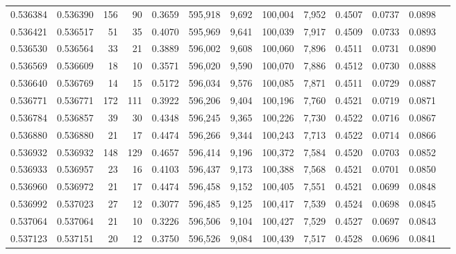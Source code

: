 \begin{tabular}{rrrrrrrrrrrrr}
0.536384 & 0.536390 &   156 &    90 &                                     0.3659 & 595,918 &   9,692 & 100,004 &   7,952 & 0.4507 & 0.0737 & 0.0898 \\
0.536421 & 0.536517 &    51 &    35 &                                     0.4070 & 595,969 &   9,641 & 100,039 &   7,917 & 0.4509 & 0.0733 & 0.0893 \\
0.536530 & 0.536564 &    33 &    21 &                                     0.3889 & 596,002 &   9,608 & 100,060 &   7,896 & 0.4511 & 0.0731 & 0.0890 \\
0.536569 & 0.536609 &    18 &    10 &                                     0.3571 & 596,020 &   9,590 & 100,070 &   7,886 & 0.4512 & 0.0730 & 0.0888 \\
0.536640 & 0.536769 &    14 &    15 &                                     0.5172 & 596,034 &   9,576 & 100,085 &   7,871 & 0.4511 & 0.0729 & 0.0887 \\
0.536771 & 0.536771 &   172 &   111 &                                     0.3922 & 596,206 &   9,404 & 100,196 &   7,760 & 0.4521 & 0.0719 & 0.0871 \\
0.536784 & 0.536857 &    39 &    30 &                                     0.4348 & 596,245 &   9,365 & 100,226 &   7,730 & 0.4522 & 0.0716 & 0.0867 \\
0.536880 & 0.536880 &    21 &    17 &                                     0.4474 & 596,266 &   9,344 & 100,243 &   7,713 & 0.4522 & 0.0714 & 0.0866 \\
0.536932 & 0.536932 &   148 &   129 &                                     0.4657 & 596,414 &   9,196 & 100,372 &   7,584 & 0.4520 & 0.0703 & 0.0852 \\
0.536933 & 0.536957 &    23 &    16 &                                     0.4103 & 596,437 &   9,173 & 100,388 &   7,568 & 0.4521 & 0.0701 & 0.0850 \\
0.536960 & 0.536972 &    21 &    17 &                                     0.4474 & 596,458 &   9,152 & 100,405 &   7,551 & 0.4521 & 0.0699 & 0.0848 \\
0.536992 & 0.537023 &    27 &    12 &                                     0.3077 & 596,485 &   9,125 & 100,417 &   7,539 & 0.4524 & 0.0698 & 0.0845 \\
0.537064 & 0.537064 &    21 &    10 &                                     0.3226 & 596,506 &   9,104 & 100,427 &   7,529 & 0.4527 & 0.0697 & 0.0843 \\
0.537123 & 0.537151 &    20 &    12 &                                     0.3750 & 596,526 &   9,084 & 100,439 &   7,517 & 0.4528 & 0.0696 & 0.0841 \\

\end{tabular}
